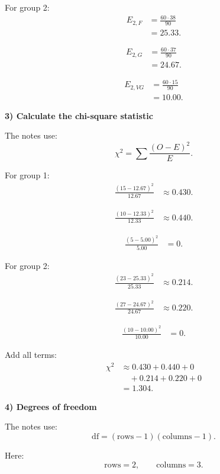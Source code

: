 \documentclass[10pt]{article}
\begin{document}
For group 2:
\begin{align*}
E_{2,F}
&=
\frac{60\cdot 38}{90}
\\[2mm]
&=25.33.
\end{align*}

\begin{align*}
E_{2,G}
&=
\frac{60\cdot 37}{90}
\\[2mm]
&=24.67.
\end{align*}

\begin{align*}
E_{2,VG}
&=
\frac{60\cdot 15}{90}
\\[2mm]
&=10.00.
\end{align*}

\textbf{3) Calculate the chi-square statistic}

The notes use:
\[
\chi^2
=
\sum
\frac{(O-E)^2}{E}.
\]

For group 1:
\begin{align*}
\frac{(15-12.67)^2}{12.67}
&\approx 0.430.
\end{align*}

\begin{align*}
\frac{(10-12.33)^2}{12.33}
&\approx 0.440.
\end{align*}

\begin{align*}
\frac{(5-5.00)^2}{5.00}
&=0.
\end{align*}

For group 2:
\begin{align*}
\frac{(23-25.33)^2}{25.33}
&\approx 0.214.
\end{align*}

\begin{align*}
\frac{(27-24.67)^2}{24.67}
&\approx 0.220.
\end{align*}

\begin{align*}
\frac{(10-10.00)^2}{10.00}
&=0.
\end{align*}

Add all terms:
\begin{align*}
\chi^2
&\approx
0.430+0.440+0
\\
&\quad
+0.214+0.220+0
\\[2mm]
&=
1.304.
\end{align*}

\textbf{4) Degrees of freedom}

The notes use:
\[
\text{df}
=
(\text{rows}-1)(\text{columns}-1).
\]

Here:
\[
\text{rows}=2,
\qquad
\text{columns}=3.
\]
\end{document}
